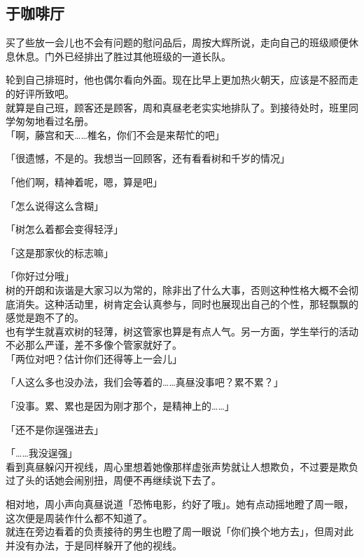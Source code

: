 \subsection{于咖啡厅}

买了些放一会儿也不会有问题的慰问品后，周按大辉所说，走向自己的班级顺便休息休息。门外已经排出了胜过其他班级的一道长队。

轮到自己排班时，他也偶尔看向外面。现在比早上更加热火朝天，应该是不胫而走的好评所致吧。\\

就算是自己班，顾客还是顾客，周和真昼老老实实地排队了。到接待处时，班里同学匆匆地看过名册。\\

「啊，藤宫和天……椎名，你们不会是来帮忙的吧」

「很遗憾，不是的。我想当一回顾客，还有看看树和千岁的情况」

「他们啊，精神着呢，嗯，算是吧」

「怎么说得这么含糊」

「树怎么着都会变得轻浮」

「这是那家伙的标志嘛」

「你好过分哦」\\

树的开朗和诙谐是大家习以为常的，除非出了什么大事，否则这种性格大概不会彻底消失。这种活动里，树肯定会认真参与，同时也展现出自己的个性，那轻飘飘的感觉是跑不了的。\\

也有学生就喜欢树的轻薄，树这管家也算是有点人气。另一方面，学生举行的活动不必那么严谨，差不多像个管家就好了。\\

「两位对吧？估计你们还得等上一会儿」

「人这么多也没办法，我们会等着的……真昼没事吧？累不累？」

「没事。累、累也是因为刚才那个，是精神上的……」

「还不是你逞强进去」

「……我没逞强」\\

看到真昼躲闪开视线，周心里想着她像那样虚张声势就让人想欺负，不过要是欺负过了头的话她会闹别扭，周便不再继续说下去了。

相对地，周小声向真昼说道「恐怖电影，约好了哦」。她有点动摇地瞪了周一眼，这次便是周装作什么都不知道了。\\

就连在旁边看着的负责接待的男生也瞪了周一眼说「你们换个地方去」，但周对此并没有办法，于是同样躲开了他的视线。\\

